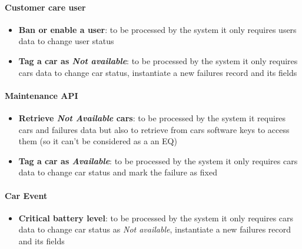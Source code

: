 \paragraph{Customer care user}
\begin{itemize}
	\item \textbf{Ban or enable a user}: to be processed by the system it only requires users data to change user status
	\item \textbf{Tag a car as \emph{Not available}}: to be processed by the system it only requires cars data to change car status, instantiate a new failures record and its fields
\end{itemize}

\paragraph{Maintenance API}
\begin{itemize}
	\item \textbf{Retrieve \emph{Not Available} cars}: to be processed by the system it requires cars and failures data but also to retrieve from cars software keys to access them (so it can't be considered as a an EQ)
	\item \textbf{Tag a car as \emph{Available}}: to be processed by the system it only requires cars data to change car status and mark the failure as fixed
\end{itemize}

\paragraph{Car Event}
\begin{itemize}
	\item \textbf{Critical battery level}: to be processed by the system it only requires cars data to change car status as \emph{Not available}, instantiate a new failures record and its fields
\end{itemize}

